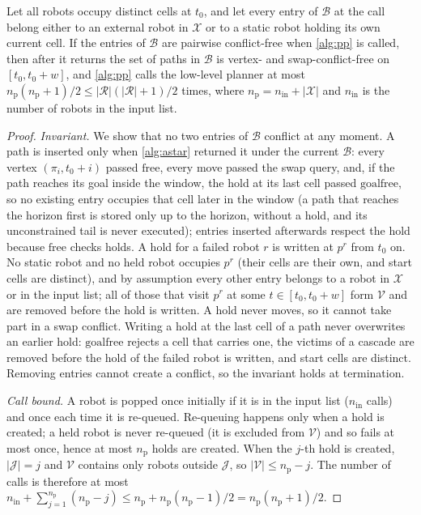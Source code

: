 \begin{proposition}\label{prop:pp}
Let all robots occupy distinct cells at $t_0$, and let every entry of
$\mathcal{B}$ at the call belong either to an external robot in
$\mathcal{X}$ or to a static robot holding its own current cell. If the
entries of $\mathcal{B}$ are pairwise conflict-free when \cref{alg:pp} is
called, then after it returns the set of paths in $\mathcal{B}$ is vertex-
and swap-conflict-free on $[t_0,t_0+w]$, and \cref{alg:pp} calls the
low-level planner at most $n_{\mathrm{p}}(n_{\mathrm{p}}+1)/2\le|\mathcal{R}|(|\mathcal{R}|+1)/2$
times, where $n_{\mathrm{p}}=n_{\mathrm{in}}+|\mathcal{X}|$ and $n_{\mathrm{in}}$ is the number of robots in the input list.
\end{proposition}
\begin{proof}
\emph{Invariant.} We show that no two entries of $\mathcal{B}$ conflict at
any moment. A path is inserted only when \cref{alg:astar} returned it under
the current $\mathcal{B}$: every vertex $(\pi_i,t_0+i)$ passed
$\mathrm{free}$, every move passed the swap query, and, if the path reaches
its goal inside the window, the hold at its last cell passed
$\mathrm{goalfree}$, so no existing entry occupies that cell later in the
window (a path that reaches the horizon first is stored only up to the
horizon, without a hold, and its unconstrained tail is never executed); entries inserted afterwards respect the hold because
$\mathrm{free}$ checks holds. A hold for a failed robot $r$ is written at
$p^r$ from $t_0$ on. No static robot and no held robot occupies $p^r$ (their
cells are their own, and start cells are distinct), and by assumption every
other entry belongs to a robot in $\mathcal{X}$ or in the input list; all of
those that visit $p^r$ at some $t\in[t_0,t_0+w]$ form $\mathcal{V}$ and are
removed before the hold is written. A hold never moves, so it cannot take
part in a swap conflict. Writing a hold at the last cell of a path never
overwrites an earlier hold: $\mathrm{goalfree}$ rejects a cell that carries
one, the victims of a cascade are removed before the hold of the failed robot
is written, and start cells are distinct. Removing entries cannot create a conflict, so the
invariant holds at termination.

\emph{Call bound.} A robot is popped once initially if it is in the input
list ($n_{\mathrm{in}}$ calls) and once each time it is re-queued. Re-queuing happens only
when a hold is created; a held robot is never re-queued (it is excluded from
$\mathcal{V}$) and so fails at most once, hence at most $n_{\mathrm{p}}$ holds are
created. When the $j$-th hold is created, $|\mathcal{J}|=j$ and
$\mathcal{V}$ contains only robots outside $\mathcal{J}$, so
$|\mathcal{V}|\le n_{\mathrm{p}}-j$. The number of calls is therefore at most
$n_{\mathrm{in}}+\sum_{j=1}^{n_{\mathrm{p}}}(n_{\mathrm{p}}-j)\le n_{\mathrm{p}}+n_{\mathrm{p}}(n_{\mathrm{p}}-1)/2=n_{\mathrm{p}}(n_{\mathrm{p}}+1)/2$.
\end{proof}

